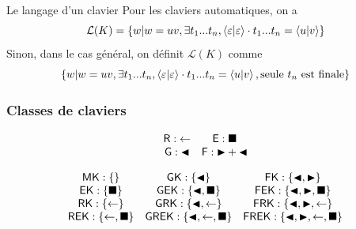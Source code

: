 \documentclass[11pt,french]{beamer}
\renewcommand{\L}{\mathcal{L}}
\begin{document}
\begin{frame}{Le langage d'un clavier}
	Pour les claviers automatiques, on a \[\L(K) = \{w | w =uv, \exists t_1...t_n, \conf{\varepsilon}{\varepsilon}\cdot t_1...t_n = \conf{u}{v}\}\] \pause
    Sinon, dans le cas général, on définit $\L(K)$ comme \[\{w | w =uv, \exists t_1...t_n, \conf{\varepsilon}{\varepsilon}\cdot t_1...t_n = \conf{u}{v}, \mathrm{seule~} t_n \mathrm{~est~finale}\}\]
\end{frame}


\begin{frame}
	\frametitle{Classes de claviers}
	\[
	 \begin{array}{cc}
		\mathsf{R}:  \retour & \mathsf{E}:  \entree \\
        \mathsf{G}:  \gauche & \mathsf{F}:  \droite + \gauche \\
	 \end{array}
	\]

	\[
		\begin{array}{ccc}
			\MK : \{\} & \GK : \{\gauche\} & \FK :\{\gauche,\droite\} \\
			\EK : \{\entree\} & \GEK : \{\gauche,\entree\} & \FEK :\{\gauche,\droite,\entree\} \\
			\RK : \{\retour\} & \GRK : \{\gauche,\retour\} & \FRK :\{\gauche,\droite,\retour\} \\
			\REK : \{\retour, \entree\} & \GREK : \{\gauche,\retour,\entree\} & \FREK :\{\gauche,\droite,\retour,\entree\} \\
		\end{array}
	\]
 \end{frame}
\end{document}
